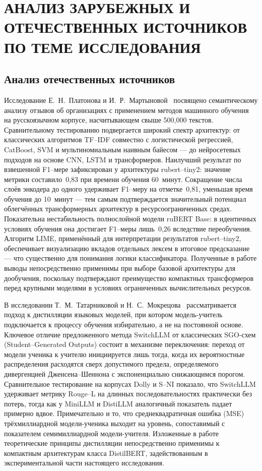 \chapter{АНАЛИЗ ЗАРУБЕЖНЫХ И ОТЕЧЕСТВЕННЫХ ИСТОЧНИКОВ ПО ТЕМЕ ИССЛЕДОВАНИЯ} \label{ch:анализ_зарубежных_и_отечественных_источников_по_теме_исследования}

\section{Анализ отечественных источников} \label{sec:анализ_отечественных_источников}

Исследование Е.~Н.~Платонова и И.~Р.~Мартыновой~\cite{Platonov2024} посвящено семантическому анализу отзывов об организациях с применением методов машинного обучения на русскоязычном корпусе, насчитывающем свыше 500,000 текстов. Сравнительному тестированию подвергается широкий спектр архитектур: от классических алгоритмов TF–IDF совместно с логистической регрессией, CatBoost, SVM и мультиномиальным наивным байесом — до нейросетевых подходов на основе CNN, LSTM и трансформеров. Наилучший результат по взвешенной F1–мере зафиксирован у архитектуры rubert–tiny2: значение метрики составило~0,83 при времени обучения 60~минут. Сокращение числа слоёв энкодера до одного удерживает F1–меру на отметке~0,81, уменьшая время обучения до 10~минут — тем самым подтверждается значительный потенциал облегчённых трансформерных архитектур в ресурсоограниченных средах. Показательна нестабильность полнослойной модели ruBERT Base: в идентичных условиях обучения она достигает F1–меры лишь~0,26 вследствие переобучения. Алгоритм LIME, применённый для интерпретации результатов rubert–tiny2, обеспечивает визуализацию вкладов отдельных лексем в итоговое предсказание — что существенно для понимания логики классификатора. Полученные в работе выводы непосредственно применимы при выборе базовой архитектуры для дообучения, поскольку подтверждают преимущество компактных трансформеров перед крупными моделями в условиях ограниченных вычислительных ресурсов.

В исследовании Т.~М.~Татарниковой и Н.~С.~Мокрецова~\cite{Tatarnikova2025} рассматривается подход к дистилляции языковых моделей, при котором модель-учитель подключается к процессу обучения избирательно, а не на постоянной основе. Ключевое отличие предложенного метода SwitchLLM от классических SGO-схем (Student–Generated Outputs) состоит в механизме переключения: переход от модели ученика к учителю инициируется лишь тогда, когда их вероятностные распределения расходятся сверх допустимого предела, определяемого дивергенцией Дженсена–Шеннона с экспоненциально снижающимся порогом. Сравнительное тестирование на корпусах Dolly и S–NI показало, что SwitchLLM удерживает метрику Rouge–L на длинных последовательностях практически без потерь, тогда как у MiniLLM и DistiLLM аналогичный показатель падает примерно вдвое. Примечательно и то, что среднеквадратичная ошибка (MSE) трёхмиллиардной модели-ученика выходит на уровень, сопоставимый с показателем семимиллиардной модели-учителя. Изложенные в работе теоретические принципы дистилляции непосредственно применимы к компактным архитектурам класса DistilBERT, задействованным в экспериментальной части настоящего исследования.

